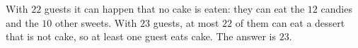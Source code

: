 With $22$ guests it can happen that no cake is eaten: they can eat the $12$ candies and the $10$ other sweets. With $23$ guests, at most $22$ of them can eat a dessert that is not cake, so at least one guest eats cake. The answer is $\boxed{23}$.
